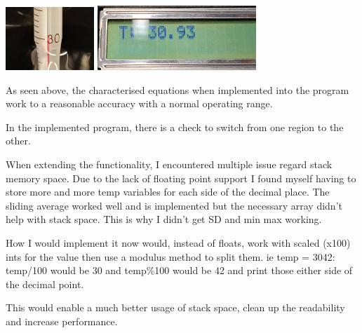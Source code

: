 \documentclass[11pt]{article}
\begin{document}
\begin{preview}
\begin{center}
                \includegraphics[width=0.25\textwidth]{res/temp1.jpg}
                \includegraphics[width=0.45\textwidth]{res/tempADC1.jpg}
        \end{center}

        As seen above, the characterised equations when implemented into the program work to a reasonable accuracy with a normal operating range.

        In the implemented program, there is a check to switch from one region to the other.

        When extending the functionality, I encountered multiple issue regard stack memory space. Due to the lack of floating point support I found myself having to store more and more temp variables for each side of the decimal place. The sliding average worked well and is implemented but the necessary array didn't help with stack space. This is why I didn't get SD and min max working.

        How I would implement it now would, instead of floats, work with scaled (x100) ints for the value then use a modulus method to split them. ie temp = 3042: temp/100 would be 30 and temp\%100 would be 42 and print those either side of the decimal point.
        
        This would enable a much better usage of stack space, clean up the readability and increase performance. 

        

\end{preview}
\end{document}
